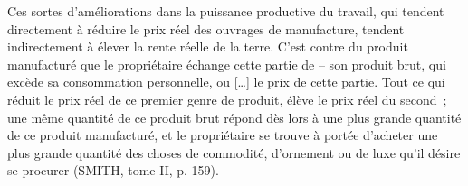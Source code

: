 \documentclass[french,twoside]{book} %
\newenvironment{quoteblock}%
  {\begin{quoting}}
  {\end{quoting}}
\newenvironment{quotebar}{%
    \def\FrameCommand{{\color{rubric!10!}\vrule width 0.5em} \hspace{0.9em}}%
    \def\OuterFrameSep{\itemsep} %
    \MakeFramed {\advance\hsize-\width \FrameRestore}
  }%
  {%
    \endMakeFramed
  }
\renewenvironment{quoteblock}%
  {%
    \savenotes
    \setstretch{0.9}
    \normalfont
    \begin{quotebar}
  }
  {%
    \end{quotebar}
    \spewnotes
  }
\begin{document}
\begin{quoteblock}
 \noindent Ces sortes d’améliorations dans la puissance productive du travail, qui tendent directement à réduire le prix réel des ouvrages de manufacture, tendent indirectement à élever la rente réelle de la terre. C’est contre du produit manufacturé que le propriétaire échange cette partie de – son produit brut, qui excède sa consommation personnelle, ou […] le prix de cette partie. Tout ce qui réduit le prix réel de ce premier genre de produit, élève le prix réel du second ; une même quantité de ce produit brut répond dès lors à une plus grande quantité de ce produit manufacturé, et le propriétaire se trouve à portée d’acheter une plus grande quantité des choses de commodité, d’ornement ou de luxe qu’il désire se procurer (SMITH, tome II, p. 159).
 \end{quoteblock}
\end{document}
